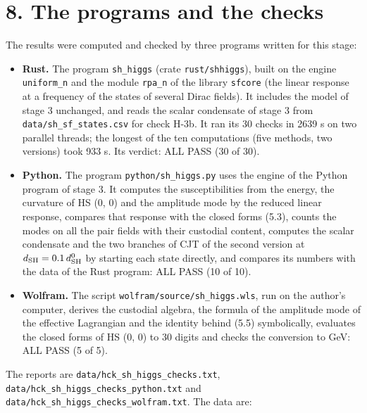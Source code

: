 \documentclass[
  10pt,
]{article}
\providecommand{\tightlist}{%
  \setlength{\itemsep}{0pt}\setlength{\parskip}{0pt}}
\begin{document}
\hypertarget{the-programs-and-the-checks}{%
\section{8. The programs and the
checks}\label{the-programs-and-the-checks}}

The results were computed and checked by three programs written for this
stage:

\begin{itemize}
\tightlist
\item
  \textbf{Rust.} The program \texttt{sh\_higgs} (crate
  \texttt{rust/shhiggs}), built on the engine \texttt{uniform\_n} and
  the module \texttt{rpa\_n} of the library \texttt{sfcore} (the linear
  response at a frequency of the states of several Dirac fields). It
  includes the model of stage 3 unchanged, and reads the scalar
  condensate of stage 3 from \texttt{data/sh\_sf\_states.csv} for check
  H-3b. It ran its 30 checks in 2639 s on two parallel threads; the
  longest of the ten computations (five methods, two versions) took 933
  s. Its verdict: ALL PASS (30 of 30).
\item
  \textbf{Python.} The program \texttt{python/sh\_higgs.py} uses the
  engine of the Python program of stage 3. It computes the
  susceptibilities from the energy, the curvature of HS (0, 0) and the
  amplitude mode by the reduced linear response, compares that response
  with the closed forms (5.3), counts the modes on all the pair fields
  with their custodial content, computes the scalar condensate and the
  two branches of CJT of the second version at
  \(d_{\rm SH}=0.1\,d^0_{\rm SH}\) by starting each state directly, and
  compares its numbers with the data of the Rust program: ALL PASS (10
  of 10).
\item
  \textbf{Wolfram.} The script \texttt{wolfram/source/sh\_higgs.wls},
  run on the author's computer, derives the custodial algebra, the
  formula of the amplitude mode of the effective Lagrangian and the
  identity behind (5.5) symbolically, evaluates the closed forms of HS
  (0, 0) to 30 digits and checks the conversion to GeV: ALL PASS (5 of
  5).
\end{itemize}

The reports are \texttt{data/hck\_sh\_higgs\_checks.txt},
\texttt{data/hck\_sh\_higgs\_checks\_python.txt} and
\texttt{data/hck\_sh\_higgs\_checks\_wolfram.txt}. The data are:
\end{document}

